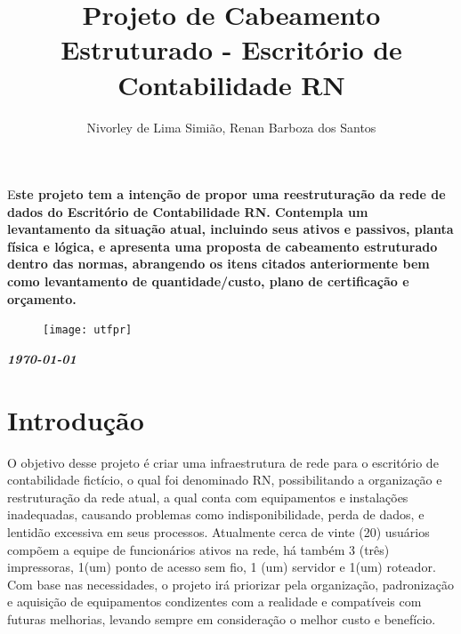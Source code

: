 \documentclass[	DIV=calc,%
							paper=a4,%
							fontsize=12pt,%
							onecolumn]{scrartcl}	 					%
\title{Projeto de Cabeamento Estruturado - Escritório de Contabilidade RN}					%
\author{Nivorley de Lima Simião, Renan Barboza dos Santos}  	%
\date{}																				%
\newcommand{\initial}[1]{%
     \lettrine[lines=3,lhang=0.3,nindent=0em]{
     				\color{DarkGoldenrod}
     				{\textsf{#1}}}{}}
\begin{document}
\maketitle
\thispagestyle{fancy} 	
\thispagestyle{empty}		%




\initial{E}\textbf{ste projeto tem a intenção de propor uma reestruturação da rede de dados do Escritório de Contabilidade RN. Contempla um levantamento da situação atual, incluindo seus ativos e passivos, planta física e lógica, e apresenta uma proposta de cabeamento estruturado dentro das normas, abrangendo os itens citados anteriormente bem como levantamento de quantidade/custo, plano de certificação e orçamento.}

\begin{figure}
	\centering
	\texttt{[image: utfpr]}
\end{figure}

\vspace{3cm}
\centerline{\textit{\textbf{\today}}}

\clearpage
    \renewcommand*\listfigurename{Lista de figuras}
\listoffigures

\renewcommand*\listtablename{Lista de tabelas}
\listoftables




\clearpage
\renewcommand{\contentsname}{Sumário}
\tableofcontents
\clearpage

\section{Introdução}
O objetivo desse projeto é criar uma infraestrutura de rede para o escritório de contabilidade fictício, o qual foi denominado RN, possibilitando a organização e restruturação da rede atual, a qual conta com equipamentos e instalações inadequadas, causando problemas como indisponibilidade, perda de dados, e lentidão excessiva em seus processos. 
Atualmente cerca de vinte (20) usuários compõem a equipe de funcionários ativos na rede, há também 3 (três) impressoras, 1(um) ponto de acesso sem fio, 1 (um) servidor e 1(um) roteador.
Com base nas necessidades, o projeto irá priorizar pela organização, padronização e aquisição de equipamentos condizentes com a realidade e compatíveis com futuras melhorias, levando sempre em consideração o melhor custo e benefício. 
\end{document}
